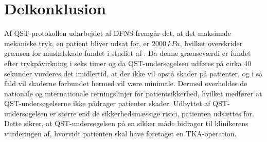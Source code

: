 \section{Delkonklusion}
Af QST-protokollen udarbejdet af DFNS fremgår det, at det maksimale mekaniske tryk, en patient bliver udsat for, er $2000~kPa$, hvilket overskrider grænsen for muskelskade fundet i studiet af . Da denne grænseværdi er fundet efter trykpåvirkning i seks timer og da QST-undersøgelsen udføres på cirka 40 sekunder vurderes det imidlertid, at der ikke vil opstå skader på patienter, og i så fald vil skaderne forbundet hermed vil være minimale. Dermed overholdes de nationale og internationale retningslinjer for patientsikkerhed, hvilket medfører at QST-undersøgelserne ikke pådrager patienter skader. Udbyttet af QST-undersøgelsen er større end de sikkerhedsmæssige risici, patienten udsættes for. Dette sikrer, at QST-undersøgelsen på en sikker måde bidrager til klinikerens vurderingen af, hvorvidt patienten skal have foretaget en TKA-operation.


